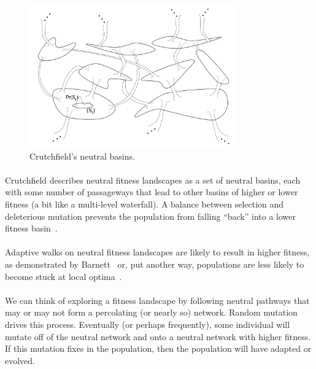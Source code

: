 \documentclass[12pt,letterpaper,titlepage]{article}
\begin{document}
\begin{figure}
    \centering
    \includegraphics[width=0.8\textwidth]{crutchfield-basins}
    \caption{Crutchfield's neutral basins.}
\label{fig:crutchfield-basins}
\end{figure}

\paragraph{}
Crutchfield describes neutral fitness landscapes as a set of neutral basins,
each with some number of passageways that lead to other basins of higher or
lower fitness (a bit like a multi-level waterfall). A balance between selection
and deleterious mutation prevents the population from falling ``back'' into a
lower fitness basin~\cite{Crutchfield1999}.

\paragraph{}
Adaptive walks on neutral fitness landscapes are likely to result in higher
fitness, as demonstrated by Barnett~\cite{Barnett1998} or, put another way,
populations are less likely to become stuck at local optima~\cite{Newman1998}.

\paragraph{}
We can think of exploring a fitness landscape by following neutral pathways
that may or may not form a percolating (or nearly so) network. Random mutation
drives this process. Eventually (or perhaps frequently), some individual will
mutate off of the neutral network and onto a neutral network with higher
fitness. If this mutation fixes in the population, then the population will
have adapted or evolved.
\end{document}
